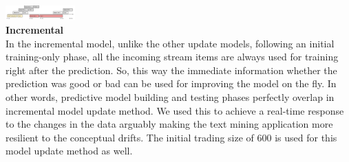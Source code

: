 \\
\\
\includegraphics[width=0.2\textwidth]{./time_models/Errortriggered}\\
\textbf{\large Incremental}\\
In the incremental model, unlike the other update models, following an initial training-only phase, all the incoming stream items are always used for training right after the prediction. So, this way the immediate information whether the prediction was good or bad can be used for improving the model on the fly. In other words, predictive model building and testing phases perfectly overlap in incremental model update method. We used this to achieve a real-time response to the changes in the data arguably making the text mining application more resilient to the conceptual drifts. The initial trading size of 600 is used for this model update method as well.

